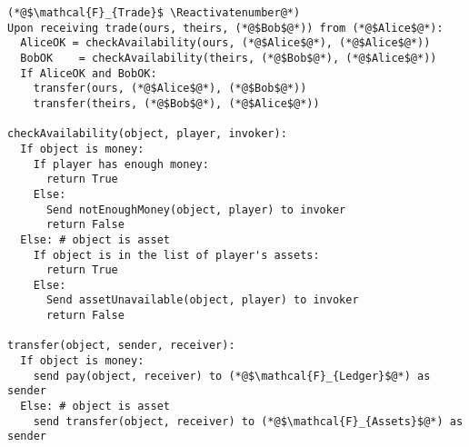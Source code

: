 \Suppressnumber
\begin{lstlisting}[label=tradefunc, style=numbers]
(*@$\mathcal{F}_{Trade}$ \Reactivatenumber@*)
Upon receiving trade(ours, theirs, (*@$Bob$@*)) from (*@$Alice$@*):
  AliceOK = checkAvailability(ours, (*@$Alice$@*), (*@$Alice$@*))
  BobOK    = checkAvailability(theirs, (*@$Bob$@*), (*@$Alice$@*))
  If AliceOK and BobOK:
    transfer(ours, (*@$Alice$@*), (*@$Bob$@*))
    transfer(theirs, (*@$Bob$@*), (*@$Alice$@*))

checkAvailability(object, player, invoker):
  If object is money:
    If player has enough money:
      return True
    Else:
      Send notEnoughMoney(object, player) to invoker
      return False
  Else: # object is asset
    If object is in the list of player's assets:
      return True
    Else:
      Send assetUnavailable(object, player) to invoker
      return False

transfer(object, sender, receiver):
  If object is money:
    send pay(object, receiver) to (*@$\mathcal{F}_{Ledger}$@*) as sender
  Else: # object is asset
    send transfer(object, receiver) to (*@$\mathcal{F}_{Assets}$@*) as sender
\end{lstlisting}
